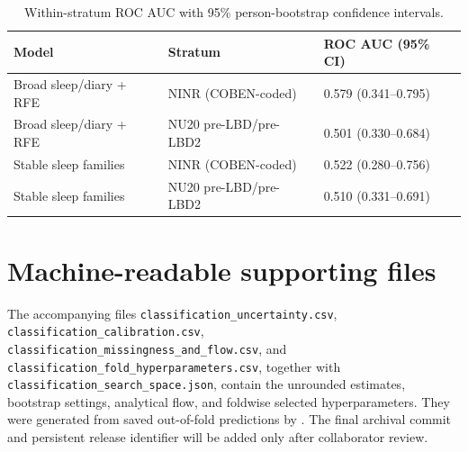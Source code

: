 \documentclass[11pt,a4paper]{article}
\newcommand{\ci}[3]{#1 (#2--#3)}
\begin{document}
\begin{table}[H]
\caption{Within-stratum ROC AUC with 95\% person-bootstrap confidence intervals.}
\label{tab:s5-within}
\centering
\small
\begin{tabular}{@{}lll@{}}
\toprule
Model & Stratum & ROC AUC (95\% CI) \\
\midrule
Broad sleep/diary + RFE & NINR (COBEN-coded) & \ci{0.579}{0.341}{0.795} \\
Broad sleep/diary + RFE & NU20 pre-LBD/pre-LBD2 & \ci{0.501}{0.330}{0.684} \\
Stable sleep families & NINR (COBEN-coded) & \ci{0.522}{0.280}{0.756} \\
Stable sleep families & NU20 pre-LBD/pre-LBD2 & \ci{0.510}{0.331}{0.691} \\
\bottomrule
\end{tabular}
\end{table}

\section*{Machine-readable supporting files}

The accompanying files \texttt{classification\_uncertainty.csv},
\texttt{classification\_calibration.csv},
\texttt{classification\_missingness\_and\_flow.csv}, and
\texttt{classification\_fold\_hyperparameters.csv}, together with
\texttt{classification\_search\_space.json}, contain the unrounded
estimates, bootstrap settings, analytical flow, and foldwise selected
hyperparameters. They were generated from saved out-of-fold predictions by
. The final archival commit
and persistent release identifier will be added only after collaborator review.
\end{document}
